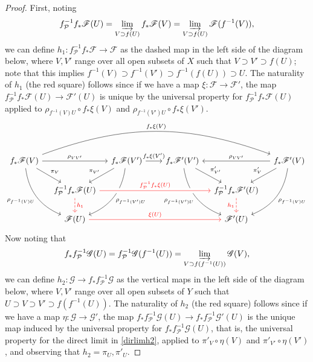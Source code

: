 \documentclass[10pt]{article}
\theoremstyle{definition}
\theoremstyle{remark}
\numberwithin{equation}{section}
\numberwithin{figure}{subsubsection}
\begin{document}
\begin{proof}
  First, noting
  \begin{equation*}
    f_\mathcal{P}^{-1}f_*\mathscr{F}(U) = \varinjlim_{V \supset f(U)} f_*\mathscr{F}(V) = \varinjlim_{V \supset f(U)} \mathscr{F}(f^{-1}(V)),
  \end{equation*}
  we can define $h_1\colon f^{-1}_\mathcal{P}f_*\mathscr{F} \to \mathscr{F}$ as the dashed map in the left side of the diagram below, where $V,V'$ range over all open subsets of $X$ such that $V \supset V' \supset f(U)$; note that this implies $f^{-1}(V) \supset f^{-1}(V') \supset f^{-1}(f(U)) \supset U$. The naturality of $h_1$ (the red square) follows since if we have a map $\xi\colon \mathscr{F} \to \mathscr{F}'$, the map $f_\mathcal{P}^{-1}f_*\mathscr{F}(U) \to \mathscr{F}'(U)$ is unique by the universal property for $f_\mathcal{P}^{-1}f_*\mathscr{F}(U)$ applied to $\rho_{f^{-1}(V)U} \circ f_*\xi(V)$ and $\rho_{f^{-1}(V')U} \circ f_*\xi(V')$.
  \begin{equation*}
    \begin{tikzcd}[column sep=2.4ex]
      f_*\mathscr{F}(V) \arrow[bend left=20]{rrrrrr}{f_*\xi(V)}\arrow{rr}{\rho_{VV'}}\arrow{dr}{\pi_V}\arrow[bend right]{ddr}[swap]{\rho_{f^{-1}(V)U}} & & f_*\mathscr{F}(V')\arrow{rr}{f_*\xi(V')}\arrow{dl}[swap]{\pi_{V'}}\arrow[bend left]{ddl}{\rho_{f^{-1}(V')U}} & & f_*\mathscr{F}'(V')\arrow{dr}{\pi'_{V'}}\arrow[bend right]{ddr}[swap]{\rho_{f^{-1}(V')U}} & & f_*\mathscr{F}'(V)\arrow{ll}[swap]{\rho_{VV'}}\arrow{dl}[swap]{\pi'_V}\arrow[bend left]{ddl}{\rho_{f^{-1}(V)U}}\\
      & f^{-1}_\mathcal{P}f_*\mathscr{F}(U)\arrow[red,crossing over]{rrrr}{f_\mathcal{P}^{-1}f_*\xi(U)}\dar[red,dashed]{h_1} & & & & f^{-1}_\mathcal{P}f_*\mathscr{F}'(U)\dar[red,dashed,swap]{h_1}\\
      & \mathscr{F}(U) \arrow[red,crossing over]{rrrr}{\xi(U)} & & & & \mathscr{F}'(U)
    \end{tikzcd}
  \end{equation*}
  Now noting that
  \begin{equation}\label{dirlimh2}
    f_*f^{-1}_\mathcal{P}\mathscr{G}(U) = f^{-1}_\mathcal{P}\mathscr{G}(f^{-1}(U)) = \varinjlim_{V \supset f(f^{-1}(U))} \mathscr{G}(V),
  \end{equation}
  we can define $h_2\colon\mathscr{G} \to f_*f^{-1}_\mathcal{P}\mathscr{G}$ as the vertical maps in the left side of the diagram below, where $V,V'$ range over all open subsets of $Y$ such that $U \supset V \supset V' \supset f(f^{-1}(U))$. The naturality of $h_2$ (the red square) follows since if we have a map $\eta\colon \mathscr{G} \to \mathscr{G}'$, the map $f_*f_\mathcal{P}^{-1}\mathscr{G}(U) \to f_*f_\mathcal{P}^{-1}\mathscr{G}'(U)$ is the unique map induced by the universal property for $f_*f_\mathcal{P}^{-1}\mathscr{G}(U)$, that is, the universal property for the direct limit in \eqref{dirlimh2}, applied to $\pi'_V \circ \eta(V)$ and $\pi'_{V'} \circ \eta(V')$, and observing that $h_2 = \pi_U,\pi'_U$.

\end{proof}
\end{document}
